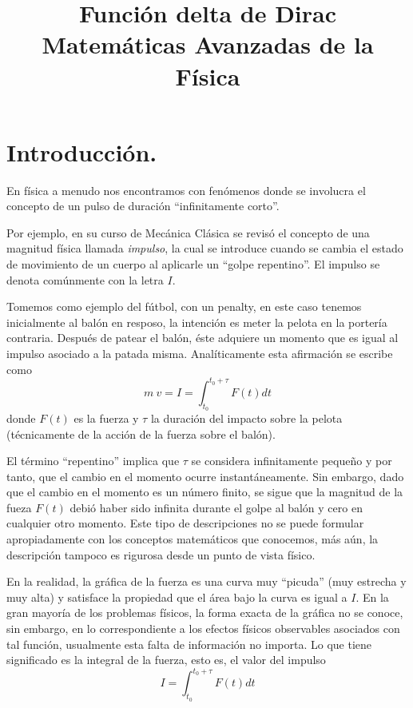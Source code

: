 
\usepackage{standalone}
\usepackage{geometry}
\geometry{top=1.25cm, bottom=1.5cm, left=1.25cm, right=1.25cm}
\newtheorem{defi}{{\it Definición}}[section]
\newtheorem{ejemplo}{{\it Ejemplo}}[section]
\newtheorem{propiedad}{{\it Propiedad}}[section]
\title{Función delta de Dirac \\ \large {Matemáticas Avanzadas de la Física}  \vspace{-1.5\baselineskip}}
\date{}

\renewcommand\labelenumii{\theenumi.{\arabic{enumii}}}
\maketitle
\fontsize{14}{14}\selectfont
\section{Introducción.}
En física a menudo nos encontramos con fenómenos donde se involucra el concepto de un pulso de duración \enquote{infinitamente corto}.
\par
Por ejemplo, en su curso de Mecánica Clásica se revisó el concepto de una magnitud física llamada \emph{impulso}, la cual se introduce cuando se cambia el estado de movimiento de un cuerpo al aplicarle un \enquote{golpe repentino}. El impulso se denota comúnmente con la letra $I$.
\par
Tomemos como ejemplo del fútbol, con un penalty, en este caso tenemos inicialmente al balón en resposo, la intención es meter la pelota en la portería contraria. Después de patear el balón, éste adquiere un momento que es igual al impulso asociado a la patada misma. Analíticamente esta afirmación se escribe como
\[ m \: v = I = \int_{t_{0}}^{t_{0} + \tau} F(t) dt  \]
donde $F(t)$ es la fuerza y $\tau$ la duración del impacto sobre la pelota (técnicamente de la acción de la fuerza sobre el balón).
\par
El término \enquote{repentino} implica que $\tau$ se considera infinitamente pequeño y por tanto, que el cambio en el momento ocurre instantáneamente. Sin embargo, dado que el cambio en el momento es un número finito, se sigue que la magnitud de la fueza $F(t)$ debió haber sido infinita durante el golpe al balón y cero en cualquier otro momento. Este
tipo de descripciones no se puede formular apropiadamente con los conceptos matemáticos que conocemos, más aún, la descripción tampoco es rigurosa desde un punto de vista físico.
\par
En la realidad, la gráfica de la fuerza es una curva muy \enquote{picuda} (muy estrecha y muy alta) y satisface la propiedad que el área bajo la curva es igual a $I$. En la gran mayoría de los problemas físicos, la forma exacta de la gráfica no se conoce, sin embargo, en lo correspondiente a los efectos físicos observables asociados con tal función, usualmente esta falta de información no importa. Lo que tiene significado es la integral de la fuerza, esto es, el valor del impulso
\[ I = \int_{t_{0}}^{t_{0} + \tau } F(t) dt\]
